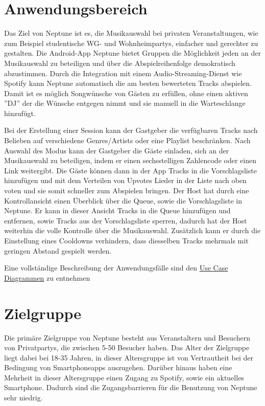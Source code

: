 \documentclass[oneside, ngerman]{sdqtechreport}
\begin{document}
\section{Anwendungsbereich}
\label{sec:Einleitung:Anwendungsbereich}

Das Ziel von Neptune ist es, die Musikauswahl bei privaten Veranstaltungen, wie zum Beispiel studentische WG- und Wohnheimpartys, einfacher und gerechter zu gestalten.
Die Android-App Neptune bietet Gruppen die Möglichkeit jeden an der Musikauswahl zu beteiligen und über die Abspielreihenfolge demokratisch abzustimmen. Durch die Integration mit einem Audio-Streaming-Dienst wie Spotify kann Neptune automatisch die am besten bewerteten Tracks abspielen. Damit ist es möglich Songwünsche von Gästen zu erfüllen, ohne einen aktiven ''DJ''  der die Wünsche entgegen nimmt und sie manuell in die Warteschlange hinzufügt.

Bei der Erstellung einer Session kann der Gastgeber die verfügbaren Tracks nach Belieben auf verschiedene Genres/Artists oder eine Playlist beschränken. Nach Auswahl des Modus kann der Gastgeber die Gäste einladen, sich an der Musikauswahl zu beteiligen, indem er einen sechsstelligen Zahlencode oder einen Link weitergibt. Die Gäste können dann in der App Tracks in die Vorschlagsliste hinzufügen und mit dem Verteilen von Upvotes Lieder in der Liste nach oben voten und sie somit schneller zum Abspielen bringen. Der Host hat durch eine Kontrollansicht einen Überblick über die Queue, sowie die Vorschlagsliste in Neptune. Er kann in dieser Ansicht Tracks in die Queue hinzufügen und entfernen, sowie Tracks aus der Vorschlagsliste sperren, dadurch hat der Host weiterhin die volle Kontrolle über die Musikauswahl. Zusätzlich kann er durch die Einstellung
eines Cooldowns verhindern, dass diesselben Tracks mehrmals mit geringen Abstand gespielt werden.

Eine vollständige Beschreibung der Anwendungsfälle sind  den \hyperlink{Anwendungsfaelle}{Use Case Diagrammen} zu entnehmen   


\section{Zielgruppe}
\label{sec:Einleitung:Zielgruppe}

Die primäre Zielgruppe von Neptune besteht aus Veranstaltern und Besuchern von Privatpartys, die zwischen 5-50 Besucher haben. Das Alter der Zielgruppe liegt dabei bei 18-35 Jahren, in dieser Altersgruppe ist von Vertrautheit bei der Bedingung von Smartphoneapps auszugehen. Darüber hinaus haben eine Mehrheit in dieser Altersgruppe einen Zugang zu Spotify, sowie ein aktuelles Smartphone. Dadurch sind die Zugangsbarrieren für die Benutzung von Neptune sehr niedrig.
\end{document}
